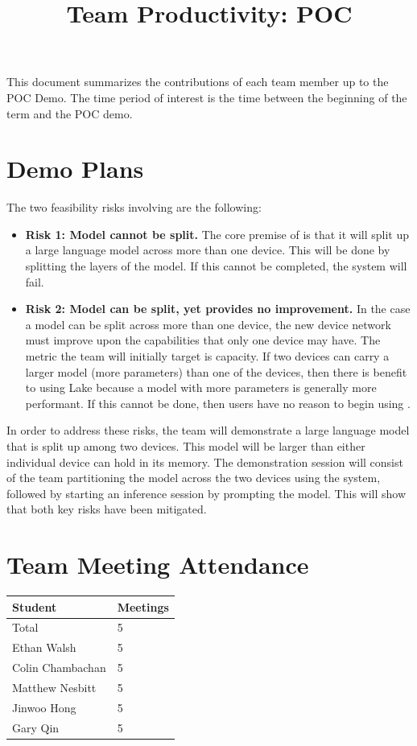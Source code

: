 \documentclass{article}
\title{Team Productivity: POC\\\progname}
\author{\authname}
\date{}
\begin{document}
\maketitle

This document summarizes the contributions of each team member up to the POC
Demo.  The time period of interest is the time between the beginning of the term
and the POC demo.

\section{Demo Plans}

The two feasibility risks involving \progname{} are the following:

\begin{itemize}
    \item\textbf{Risk 1: Model cannot be split.} The core premise of \progname{} is that it will split up a large language model across more than one device. This will be done by splitting the layers of the model.
    If this cannot be completed, the system will fail.
    \item\textbf{Risk 2: Model can be split, yet provides no improvement.} In the case a model can be split across more than one device, the new device network must improve upon the capabilities that only one device may have.
    The metric the team will initially target is capacity. If two devices can carry a larger model (more parameters) than one of the devices, then there is benefit to using Lake because a model with more parameters is
    generally more performant. If this cannot be done, then users have no reason to begin using \progname{}.
\end{itemize}

In order to address these risks, the team will demonstrate a large language model that is split up among two devices. This model will be larger than either individual device can hold in its memory.
The demonstration session will consist of the team partitioning the model across the two devices using the \progname{} system, followed by starting an inference session by prompting the model.
This will show that both key risks have been mitigated.

\section{Team Meeting Attendance}

\begin{table}[H]
\centering
\begin{tabular}{ll}
\toprule
\textbf{Student} & \textbf{Meetings}\\
\midrule
Total & 5\\
Ethan Walsh & 5\\
Colin Chambachan & 5\\
Matthew Nesbitt & 5\\
Jinwoo Hong & 5\\
Gary Qin & 5\\
\bottomrule
\end{tabular}
\end{table}
\end{document}

